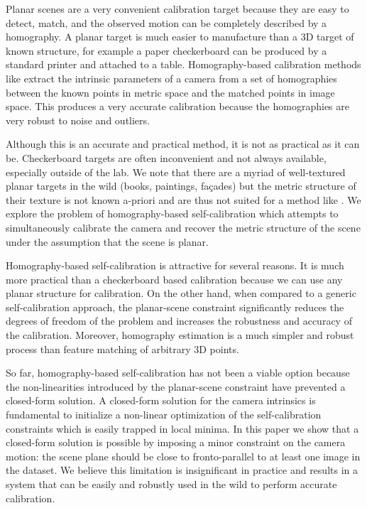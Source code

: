 \documentclass[10pt,twocolumn,letterpaper]{article}
\begin{document}
Planar scenes are a very convenient calibration target because they are easy to detect, match, and the observed motion can be completely described by a homography. A planar target is much easier to manufacture than a 3D target of known structure, for example a paper checkerboard can be produced by a standard printer and attached to a table. Homography-based calibration methods like \cite{zhang1999} extract the intrinsic parameters of a camera from a set of homographies between the known points in metric space and the matched points in image space. This produces a very accurate calibration because the homographies are very robust to noise and outliers. 

Although this is an accurate and practical method, it is not as practical as it can be. Checkerboard targets are often inconvenient and not always available, especially outside of the lab. We note that there are a myriad of well-textured planar targets in the wild (books, paintings, fa\c{c}ades) but the metric structure of their texture is not known a-priori and are thus not suited for a method like \cite{zhang1999}. We explore the problem of homography-based self-calibration which attempts to simultaneously calibrate the camera and recover the metric structure of the scene under the assumption that the scene is planar.

Homography-based self-calibration is attractive for several reasons. It is much more practical than a checkerboard based calibration because we can use any planar structure for calibration. On the other hand, when compared to a generic self-calibration approach, the planar-scene constraint significantly reduces the degrees of freedom of the problem and increases the robustness and accuracy of the calibration. Moreover, homography estimation is a much simpler and robust process than feature matching of arbitrary 3D points.

So far, homography-based self-calibration has not been a viable option because the non-linearities introduced by the planar-scene constraint have prevented a closed-form solution. A closed-form solution for the camera intrinsics is fundamental to initialize a non-linear optimization of the self-calibration constraints which is easily trapped in local minima. In this paper we show that a closed-form solution is possible by imposing a minor constraint on the camera motion: the scene plane should be close to fronto-parallel to at least one image in the dataset. We believe this limitation is insignificant in practice and results in a system that can be easily and robustly used in the wild to perform accurate calibration.
\end{document}

